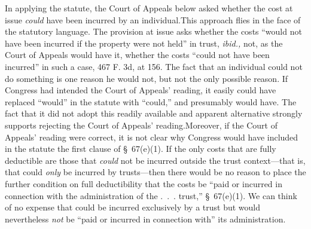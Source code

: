   In applying the statute, the Court of Appeals below asked whether the cost at issue \emph{could} have been incurred by an individual.\footnotemark[3] This approach flies in the face of the statutory \newpage  language. The provision at issue asks whether the costs ``would not have been incurred if the property were not held'' in trust, \emph{ibid.,} not, as the Court of Appeals would have it, whether the costs ``could not have been incurred'' in such a case, 467 F. 3d, at 156. The fact that an individual could not do something is one reason he would not, but not the only possible reason. If Congress had intended the Court of Appeals' reading, it easily could have replaced ``would'' in the statute with ``could,'' and presumably would have. The fact that it did not adopt this readily available and apparent alternative strongly supports rejecting the Court of Appeals' reading.\footnotemark[4] Moreover, if the Court of Appeals' reading were correct, it is not clear why Congress would have included in the stat\newpage ute the first clause of \S~67(e)(1). If the only costs that are fully deductible are those that \emph{could} not be incurred outside the trust context---that is, that could \emph{only} be incurred by trusts---then there would be no reason to place the further condition on full deductibility that the costs be ``paid or incurred in connection with the administration of the .~.~. trust,'' \S~67(e)(1). We can think of no expense that could be incurred exclusively by a trust but would nevertheless \emph{not} be ``paid or incurred in connection with'' its administration.


